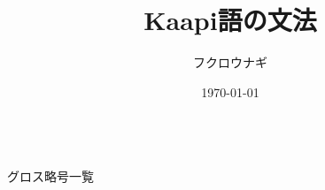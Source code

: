 \documentclass[uplatex, a4paper]{jsarticle}
\title{Kaapi語の文法}
\author{
    フクロウナギ
    }
\date{\today}
\begin{document}
\maketitle
\newpage

\tableofcontents
　\\
グロス略号一覧\\
\printglossaries
\newpage


\end{document}

